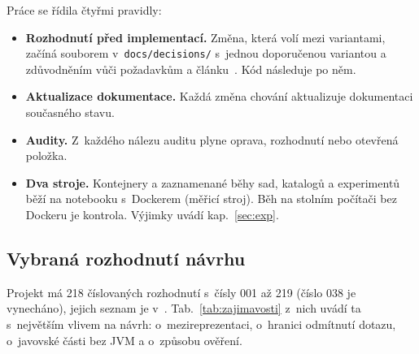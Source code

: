 Práce se řídila čtyřmi pravidly:

\begin{itemize}[leftmargin=*,itemsep=1pt]
\item \textbf{Rozhodnutí před implementací.} Změna, která volí mezi variantami, začíná souborem v~\texttt{docs/decisions/} s~jednou doporučenou variantou a zdůvodněním vůči požadavkům a článku~\cite{ormorpher-jss}. Kód následuje po něm.
\item \textbf{Aktualizace dokumentace.} Každá změna chování aktualizuje dokumentaci současného stavu.
\item \textbf{Audity.} Z~každého nálezu auditu plyne oprava, rozhodnutí nebo otevřená položka.
\item \textbf{Dva stroje.} Kontejnery a zaznamenané běhy sad, katalogů a experimentů běží na notebooku s~Dockerem (měřicí stroj). Běh na stolním počítači bez Dockeru je kontrola. Výjimky uvádí kap.~\ref{sec:exp}.
\end{itemize}

\subsection{Vybraná rozhodnutí návrhu}\label{sec:zajimavosti}

Projekt má 218 číslovaných rozhodnutí s~čísly 001 až 219 (číslo 038 je vynecháno), jejich seznam je v~. Tab.~\ref{tab:zajimavosti} z~nich uvádí ta s~největším vlivem na návrh: o~mezireprezentaci, o~hranici odmítnutí dotazu, o~javovské části bez JVM a o~způsobu ověření.


